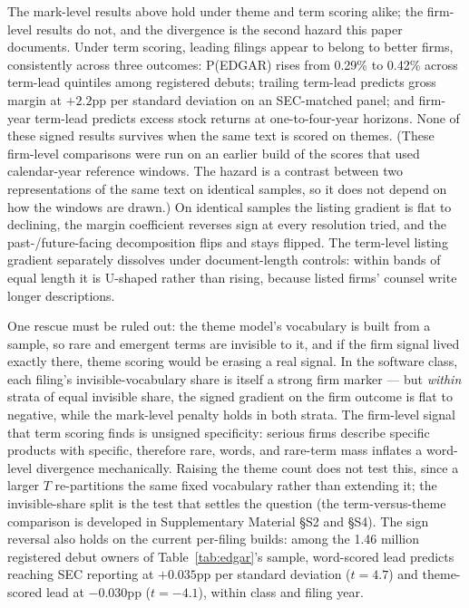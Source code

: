 The mark-level results above hold under theme and term scoring alike;
the firm-level results do not, and the divergence is the second hazard
this paper documents. Under term scoring, leading filings appear to
belong to better firms, consistently across three outcomes: P(EDGAR)
rises from 0.29\% to 0.42\% across term-lead quintiles among registered
debuts; trailing term-lead predicts gross margin at $+2.2$pp per
standard deviation on an SEC-matched panel; and firm-year term-lead
predicts excess stock returns at one-to-four-year horizons. None of
these signed results survives when the same text is scored on themes.
(These firm-level comparisons were run on an earlier build of the scores
that used calendar-year reference windows. The hazard is a contrast
between two representations of the same text on identical samples, so
it does not depend on how the windows are drawn.)
On identical samples the listing gradient is flat to declining, the
margin coefficient reverses sign at every resolution tried, and the
past-/future-facing decomposition flips and stays flipped. The
term-level listing gradient separately dissolves under document-length
controls: within bands of equal length it is U-shaped rather than
rising, because listed firms' counsel write longer descriptions.

One rescue must be ruled out: the theme model's vocabulary is built
from a sample, so rare and emergent terms are invisible to it, and if
the firm signal lived exactly there, theme scoring would be erasing a
real signal. In the software class, each filing's invisible-vocabulary
share is itself a strong firm marker --- but \emph{within} strata of equal invisible
share, the signed gradient on the firm outcome is flat to negative,
while the mark-level penalty holds in both strata. The firm-level
signal that term scoring finds is unsigned specificity: serious firms
describe specific products with specific, therefore rare, words, and
rare-term mass inflates a word-level divergence mechanically. Raising
the theme count does not test this, since a larger $T$ re-partitions
the same fixed vocabulary rather than extending it; the invisible-share
split is the test that settles the question (the term-versus-theme
comparison is developed in Supplementary Material \S S2 and \S S4).
The sign reversal also holds on the current per-filing builds: among
the 1.46 million registered debut owners of Table~\ref{tab:edgar}'s
sample, word-scored lead predicts reaching SEC reporting at $+0.035$pp
per standard deviation ($t = 4.7$) and theme-scored lead at $-0.030$pp
($t = -4.1$), within class and filing year.

